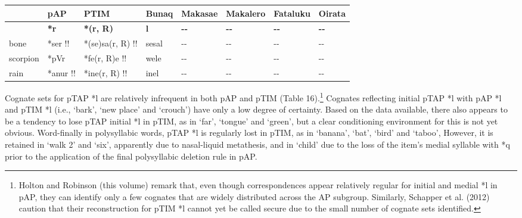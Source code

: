 \documentclass[a4paper]{article}
\begin{document}
\begin{center}
\tablehead{}
\begin{supertabular}{m{0.76435983in}m{0.6615598in}m{0.88725984in}m{0.6497598in}m{0.7698598in}m{0.7698598in}m{0.7698598in}m{0.77335984in}}
\hline
 &
pAP &
PTIM &
Bunaq &
Makasae &
Makalero &
Fataluku &
Oirata\\\hline
 &
\textbf{*r} &
\textbf{*(r, R)} &
\textbf{l} &
\textbf{{}-{}-} &
\textbf{{}-{}-} &
\textbf{{}-{}-} &
\textbf{{}-{}-}\\\hline
bone &
*ser !! &
*(se)sa(r, R) !! &
sesal &
{}-{}- &
{}-{}- &
{}-{}- &
{}-{}-\\
scorpion &
*pVr &
*fe(r, R)e !! &
wele &
{}-{}- &
{}-{}- &
{}-{}- &
{}-{}-\\
rain &
*anur !! &
*ine(r, R) !! &
inel &
{}-{}- &
{}-{}- &
{}-{}- &
{}-{}-\\\hline
\end{supertabular}
\end{center}
Cognate sets for pTAP *l are relatively infrequent in both pAP and pTIM (Table 16).\footnote{ Holton and Robinson (this volume) remark that, even though correspondences appear relatively regular for initial and medial *l in pAP, they can identify only a few cognates that are widely distributed across the AP subgroup. Similarly, Schapper et al. (2012) caution that their reconstruction for pTIM *l cannot yet be called secure due to the small number of cognate sets identified.} Cognates reflecting initial pTAP *l with pAP *l and pTIM *l (i.e., {\textquoteleft}bark{\textquoteright}, {\textquoteleft}new place{\textquoteright} and {\textquoteleft}crouch{\textquoteright}) have only a low degree of certainty. Based on the data available, there also appears to be a tendency to lose pTAP initial *l in pTIM, as in {\textquoteleft}far{\textquoteright}, {\textquoteleft}tongue{\textquoteright} and {\textquoteleft}green{\textquoteright}, but a clear conditioning environment for this is not yet obvious. Word-finally in polysyllabic words, pTAP *l is regularly lost in pTIM, as in {\textquoteleft}banana{\textquoteright}, {\textquoteleft}bat{\textquoteright}, {\textquoteleft}bird{\textquoteright} and {\textquoteleft}taboo{\textquoteright}, However, it is retained in {\textquoteleft}walk 2{\textquoteright} and {\textquoteleft}six{\textquoteright}, apparently due to nasal-liquid metathesis, and in {\textquoteleft}child{\textquoteright} due to the loss of the item{\textquoteright}s medial syllable with *q prior to the application of the final polysyllabic deletion rule in pAP.
\end{document}
